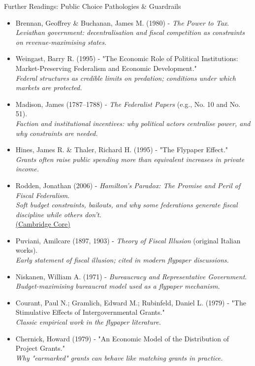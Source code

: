\documentclass[10pt]{beamer}
\begin{document}
\begin{frame}[allowframebreaks]{Further Readings: Public Choice Pathologies \& Guardrails}
\footnotesize
\begin{itemize}
\item Brennan, Geoffrey \& Buchanan, James M. (1980) - \textit{The Power to Tax}.\\
\textit{Leviathan government: decentralisation and fiscal competition as constraints on revenue-maximising states.}

\item Weingast, Barry R. (1995) - "The Economic Role of Political Institutions: Market-Preserving Federalism and Economic Development."\\
\textit{Federal structures as credible limits on predation; conditions under which markets are protected.}

\item Madison, James (1787--1788) - \textit{The Federalist Papers} (e.g., No. 10 and No. 51).\\
\textit{Faction and institutional incentives: why political actors centralise power, and why constraints are needed.}

\item Hines, James R. \& Thaler, Richard H. (1995) - "The Flypaper Effect."\\
\textit{Grants often raise public spending more than equivalent increases in private income.}

\item Rodden, Jonathan (2006) - \textit{Hamilton's Paradox: The Promise and Peril of Fiscal Federalism}.\\
\textit{Soft budget constraints, bailouts, and why some federations generate fiscal discipline while others don't.}\\
\href{https://www.cambridge.org/core/books/hamiltons-paradox/165995D3EAB511F97EC2A65246F985FF}{(Cambridge Core)}

\item Puviani, Amilcare (1897, 1903) - \textit{Theory of Fiscal Illusion} (original Italian works).\\
\textit{Early statement of fiscal illusion; cited in modern flypaper discussions.}

\item Niskanen, William A. (1971) - \textit{Bureaucracy and Representative Government}.\\
\textit{Budget-maximising bureaucrat model used as a flypaper mechanism.}

\item Courant, Paul N.; Gramlich, Edward M.; Rubinfeld, Daniel L. (1979) - "The Stimulative Effects of Intergovernmental Grants."\\
\textit{Classic empirical work in the flypaper literature.}

\item Chernick, Howard (1979) - "An Economic Model of the Distribution of Project Grants."\\
\textit{Why "earmarked" grants can behave like matching grants in practice.}


\end{itemize}
\end{frame}
\end{document}
